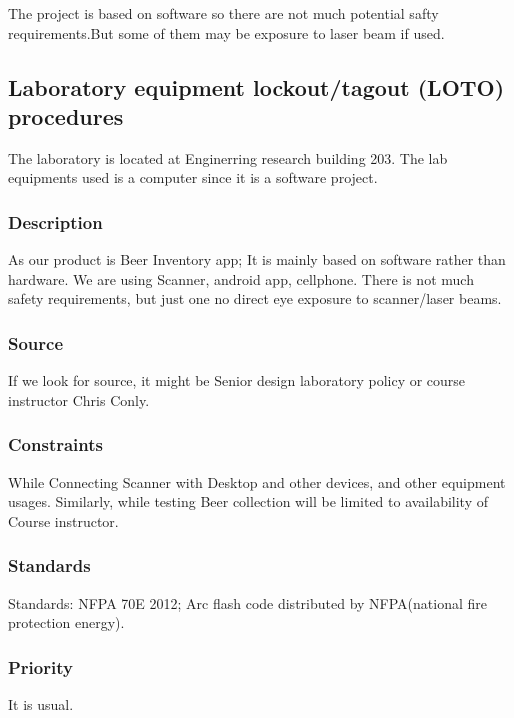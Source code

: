 The project is based on software so there are not much potential safty requirements.But some of them may be  exposure to laser beam if used.
\subsection{Laboratory equipment lockout/tagout (LOTO) procedures}
The laboratory is located at Enginerring research building 203. The lab equipments used is a computer since it is a software project.
\subsubsection{Description}
 As our product is Beer Inventory app; It is mainly based on software rather than hardware. We are using Scanner, android app, cellphone. There is not much safety requirements, but just one no direct eye exposure to scanner/laser beams. 
\subsubsection{Source}
If we look for source, it might be Senior design laboratory policy or course instructor Chris Conly. 
\subsubsection{Constraints}
While Connecting Scanner with Desktop and other devices, and other equipment usages. Similarly, while testing Beer collection will be limited to availability of Course instructor.
\subsubsection{Standards}
Standards: NFPA 70E 2012; Arc flash code distributed by NFPA(national fire protection energy).
\subsubsection{Priority}
It is usual.


